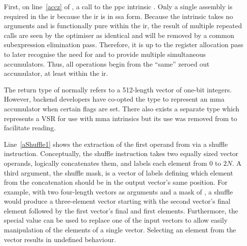 \documentclass[\main/thesis.tex]{subfiles}
\begin{document}
First, on line~\ref{accz} of , a call to the \gls{ppc} \gls{intrinsic} \footnotemark.
Only a single assembly is required in the \gls{ir} because the \gls{ir} is in \gls{ssa} form.
Because the intrinsic takes no arguments and is functionally \gls{pure} within the \gls{ir}, the result of multiple repeated calls are seen by the optimiser as identical and will be removed by a common subexpression elimination pass\footnotemark.
Therefore, it is up to the register allocation pass to later recognise the need for and to provide multiple simultaneous accumulators.
Thus, all operations begin from the ``same'' zeroed out accumulator, at least within the \gls{ir}.

The  return type of  normally refers to a 512-length vector of one-bit integers.
However, backend developers have co-opted the type to represent an \gls{mma} accumulator when certain flags are set.
There also exists a separate type which represents a VSR for use with \gls{mma} \glspl{intrinsic} but its use was removed from  to facilitate reading\footnotemark.

Line~\ref{aShuffle1} shows the extraction of the first operand from  via a shuffle instruction.
Conceptually, the shuffle instruction takes two equally sized vector operands, logically concatenates them, and labels each element from $0$ to $2N$.
A third argument, the shuffle mask, is a vector of labels defining which element from the concatenation should be in the output vector's same position.
For example, with two four-length vectors as arguments and a mask of , a shuffle would produce a three-element vector starting with the second vector's final element followed by the first vector's final and first elements.
Furthermore, the special value  can be used to replace one of the input vectors to allow easily manipulation of the elements of a single vector.
Selecting an element from the  vector results in undefined behaviour.
\end{document}
